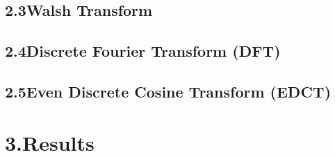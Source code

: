 \documentclass[12pt]{article}
\begin{document}
\subsection*{2.3\quad Walsh Transform}


\subsection*{2.4\quad Discrete Fourier Transform (DFT)}


\subsection*{2.5\quad Even Discrete Cosine Transform (EDCT)}




\section*{3.\quad Results}
\end{document}
